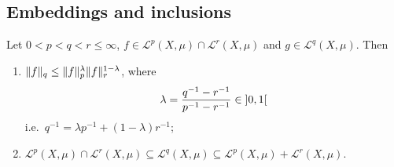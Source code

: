 \subsection{Embeddings and inclusions}

\begin{proposition}
Let $0<p<q<r \leq \infty$, $f\in \mathcal{L}^p(X,\mu) \cap \mathcal{L}^r(X,\mu)$ and $g\in \mathcal{L}^q(X,\mu)$. Then
\begin{enumerate}
\item $\lVert f\rVert_q \leq \lVert f\rVert_p^{\lambda}\lVert f\rVert_r^{1-\lambda}$, where
\[ \lambda = \frac{q^{-1} - r^{-1}}{p^{-1} - r^{-1}} \in \interval[o]{0,1} \]
i.e.\ $q^{-1} = \lambda p^{-1} + (1-\lambda)r^{-1}$;
\item $\mathcal{L}^p(X,\mu)\cap \mathcal{L}^r(X,\mu) \subseteq \mathcal{L}^q(X,\mu) \subseteq \mathcal{L}^p(X,\mu) + \mathcal{L}^r(X,\mu)$.
\end{enumerate}
\end{proposition}
